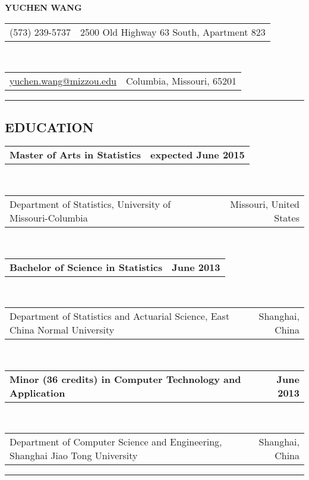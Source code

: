 \documentclass[10pt]{article}
\makeatletter
\newcommand{\headerrow}[2]
{\begin{tabular*}{\linewidth}{l@{\extracolsep{\fill}}r}
	#1 &
	#2 \\
\end{tabular*}}
\makeatother
\begin{document}
\begin{center}
\huge \textbf{YUCHEN WANG\\}
\end{center}

\noindent\headerrow
{(573) 239-5737}
{2500 Old Highway 63 South, Apartment 823}
\\
\headerrow
{\href{mailto://yuchen.wang@mizzou.edu}{yuchen.wang@mizzou.edu}}
{Columbia, Missouri, 65201}

\vspace{0.2em}
\hrule
\vspace{-1em}


\subsection*{\centering EDUCATION}

\headerrow
	{\textbf{Master of Arts in Statistics}}
	{\textbf{expected June 2015}}
\\
\headerrow
	{Department of Statistics, University of Missouri-Columbia}
	{Missouri, United States}
\\
\headerrow
	{\textbf{Bachelor of Science in Statistics}}
	{\textbf{June 2013}}
\\
\headerrow
	{Department of Statistics and Actuarial Science, East China Normal University}
	{Shanghai, China}
\\
\headerrow
	{\textbf{Minor (36 credits) in Computer Technology and Application}}
	{\textbf{June 2013}}
\\
\headerrow
	{Department of Computer Science and Engineering, Shanghai Jiao Tong University}
	{Shanghai, China}


\vspace{0.2em}
\hrule
\vspace{-1em}
\end{document}

